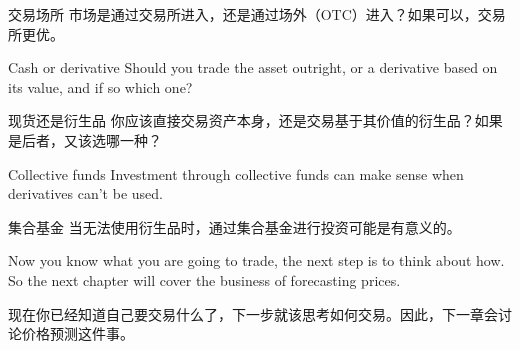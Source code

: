 \begin{chineseblock}交易场所 市场是通过交易所进入，还是通过场外（OTC）进入？如果可以，交易所更优。\end{chineseblock}

\bipairgap

\begin{englishblock} Cash or derivative Should you trade the asset outright, or a derivative based on its value, and if so which one? \end{englishblock}

\begin{chineseblock}现货还是衍生品 你应该直接交易资产本身，还是交易基于其价值的衍生品？如果是后者，又该选哪一种？\end{chineseblock}

\bipairgap

\begin{englishblock} Collective funds Investment through collective funds can make sense when derivatives can't be used. \end{englishblock}

\begin{chineseblock}集合基金 当无法使用衍生品时，通过集合基金进行投资可能是有意义的。\end{chineseblock}

\bipairgap

\begin{englishblock} Now you know what you are going to trade, the next step is to think about how. So the next chapter will cover the business of forecasting prices. \end{englishblock}

\begin{chineseblock}现在你已经知道自己要交易什么了，下一步就该思考如何交易。因此，下一章会讨论价格预测这件事。\end{chineseblock}
